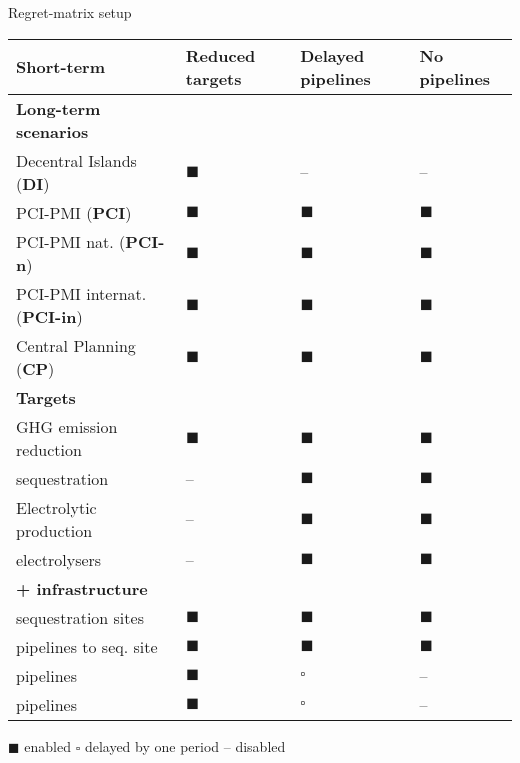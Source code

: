 \documentclass[10pt,aspectratio=169,dvipsnames]{beamer}
\begin{document}
\begin{frame}{Regret-matrix setup}
  \scriptsize
  \begin{tabularx}{\textwidth}{R{3.9cm}>{\centering\arraybackslash}X>{\centering\arraybackslash}X>{\centering\arraybackslash}X}
    \toprule
    \textbf{Short-term} & \textbf{Reduced targets} & \textbf{Delayed pipelines} & \textbf{No pipelines} \\
    \midrule
    \textbf{Long-term scenarios} & & & \\
    Decentral Islands (\textbf{DI}) & $\blacksquare$ & -- & -- \\
    PCI-PMI (\textbf{PCI}) & $\blacksquare$ & $\blacksquare$ & $\blacksquare$ \\
    PCI-PMI nat. (\textbf{PCI-n}) & $\blacksquare$ & $\blacksquare$ & $\blacksquare$\\
    PCI-PMI internat. (\textbf{PCI-in}) & $\blacksquare$ & $\blacksquare$ & $\blacksquare$ \\
    Central Planning (\textbf{CP}) & $\blacksquare$ & $\blacksquare$ & $\blacksquare$ \\
    \midrule
    \textbf{Targets} & & & \\
    GHG emission reduction &  $\blacksquare$ &  $\blacksquare$ &  $\blacksquare$ \\
     sequestration &  -- &  $\blacksquare$ &  $\blacksquare$ \\
    Electrolytic  production &  -- &  $\blacksquare$ &  $\blacksquare$ \\
     electrolysers &  -- &  $\blacksquare$ &  $\blacksquare$ \\
    \midrule
    \textbf{ +  infrastructure} & & & \\
     sequestration sites & $\blacksquare$ &  $\blacksquare$ &  $\blacksquare$ \\
     pipelines to seq. site & $\blacksquare$ &  $\blacksquare$ &  $\blacksquare$ \\
     pipelines & $\blacksquare$ &  $\square$ &  -- \\
     pipelines & $\blacksquare$ &  $\square$ &  -- \\
    \bottomrule
  \end{tabularx}
  \centering
  \scriptsize $\blacksquare$ enabled \quad $\square$ delayed by one period \quad -- disabled

\end{frame}
\end{document}
